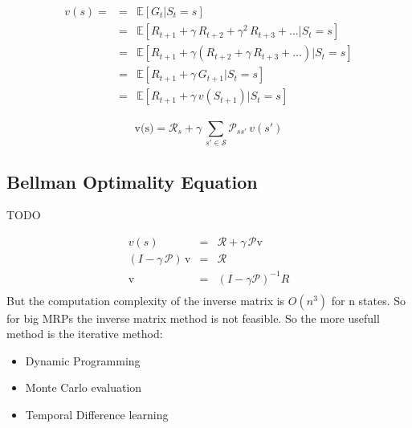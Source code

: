 \begin{eqnarray*}
    v(s) = &=& \mathbb{E}[G_{t}|S_t=s]\\
    &=& \mathbb{E}[R_{t+1} + \gamma\,R_{t+2}+\gamma^2\,R_{t+3}+\ldots|S_t=s]\\
    &=& \mathbb{E}[R_{t+1} + \gamma(R_{t+2}+\gamma\,R_{t+3}+\ldots)|S_t=s]\\
    &=& \mathbb{E}[R_{t+1} + \gamma\,G_{t+1}|S_t=s]\\
    &=& \mathbb{E}[R_{t+1} + \gamma\,v(S_{t+1})|S_t=s]
\end{eqnarray*}

\begin{center}
\end{center}

\[
    \text{v(s)} = \mathcal{R}_{s} + \gamma\,\sum_{s'\in\mathcal{S}}^{}\mathcal{P}_{ss'}\,v(s')
\]

\subsection{Bellman Optimality Equation}\label{subsec:bellman-optimality-equation}
TODO

\begin{eqnarray*}
    v(s) &=& \mathcal{R}+\gamma\,\mathcal{P}\text{v}\\
    (I - \gamma\,\mathcal{P})\,\text{v} &=& \mathcal{R}\\
    \text{v} &=& (I-\gamma\mathcal{P})^{-1} R\\
\end{eqnarray*}
But the computation complexity of the inverse matrix is $O(n^3)$ for n states.
So for big MRPs the inverse matrix method is not feasible.
So the more usefull method is the iterative method:
\begin{itemize}
    \item Dynamic Programming
    \item Monte Carlo evaluation
    \item Temporal Difference learning
\end{itemize}


